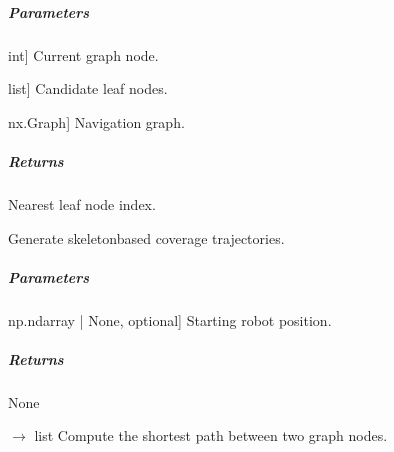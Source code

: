 \documentclass[letterpaper,10pt,english]{sphinxmanual}
\begin{document}
\begin{fulllineitems}
\begin{fulllineitems}
\subparagraph{Parameters}
\label{\detokenize{mirte_lc_nav2.navigators:id8}}\begin{description}
\sphinxlineitem{current\_node}{[}int{]}
\sphinxAtStartPar
Current graph node.

\sphinxlineitem{leaf\_nodes}{[}list{]}
\sphinxAtStartPar
Candidate leaf nodes.

\sphinxlineitem{graph}{[}nx.Graph{]}
\sphinxAtStartPar
Navigation graph.

\end{description}


\subparagraph{Returns}
\label{\detokenize{mirte_lc_nav2.navigators:id9}}\begin{description}
\sphinxAtStartPar
Nearest leaf node index.

\end{description}

\end{fulllineitems}


\begin{fulllineitems}
\label{\detokenize{mirte_lc_nav2.navigators:mirte_lc_nav2.navigators.SkeletonPath.generate_path}}
\pysigstartsignatures
\pysiglinewithargsret
{}
{}
{}
\pysigstopsignatures
\sphinxAtStartPar
Generate skeleton\sphinxhyphen{}based coverage trajectories.


\subparagraph{Parameters}
\label{\detokenize{mirte_lc_nav2.navigators:id10}}\begin{description}
\sphinxlineitem{start}{[}np.ndarray | None, optional{]}
\sphinxAtStartPar
Starting robot position.

\end{description}


\subparagraph{Returns}
\label{\detokenize{mirte_lc_nav2.navigators:id11}}
\sphinxAtStartPar
None

\end{fulllineitems}


\begin{fulllineitems}
\label{\detokenize{mirte_lc_nav2.navigators:mirte_lc_nav2.navigators.SkeletonPath.get_path}}
\pysigstartsignatures
\pysiglinewithargsret
{}
{\sphinxparamcomma {}\sphinxparamcomma {}}
{{ $\rightarrow$ list}}
\pysigstopsignatures
\sphinxAtStartPar
Compute the shortest path between two graph nodes.



\end{fulllineitems}
\end{fulllineitems}
\end{document}
